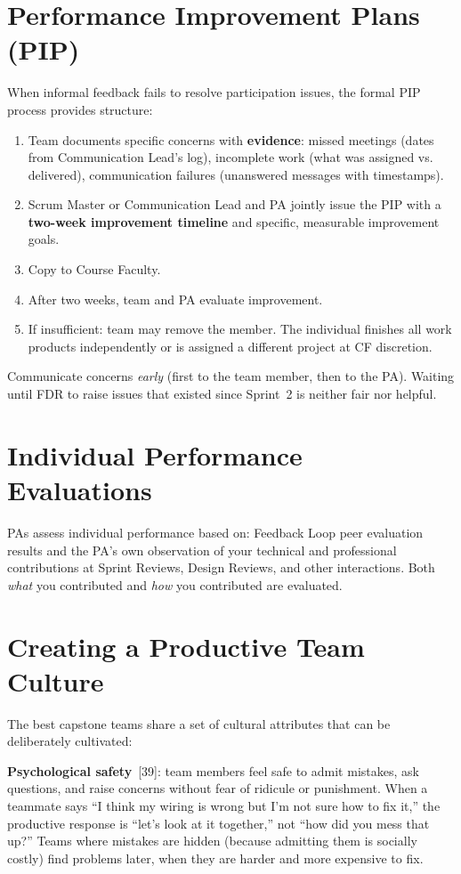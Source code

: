 \section{Performance Improvement Plans (PIP)}
When informal feedback fails to resolve participation issues, the formal PIP process provides structure:
\begin{enumerate}[nosep,leftmargin=1.5em]
\item Team documents specific concerns with \textbf{evidence}: missed meetings (dates from Communication Lead's log), incomplete work (what was assigned vs. delivered), communication failures (unanswered messages with timestamps).
\item Scrum Master or Communication Lead and PA jointly issue the PIP with a \textbf{two-week improvement timeline} and specific, measurable improvement goals.
\item Copy to Course Faculty.
\item After two weeks, team and PA evaluate improvement.
\item If insufficient: team may remove the member. The individual finishes all work products independently or is assigned a different project at CF discretion.
\end{enumerate}
Communicate concerns \emph{early} (first to the team member, then to the PA). Waiting until FDR to raise issues that existed since Sprint~2 is neither fair nor helpful.

\section{Individual Performance Evaluations}
PAs assess individual performance based on: Feedback Loop peer evaluation results and the PA's own observation of your technical and professional contributions at Sprint Reviews, Design Reviews, and other interactions. Both \emph{what} you contributed and \emph{how} you contributed are evaluated.

\section{Creating a Productive Team Culture}
The best capstone teams share a set of cultural attributes that can be deliberately cultivated:

\textbf{Psychological safety}~[39]: team members feel safe to admit mistakes, ask questions, and raise concerns without fear of ridicule or punishment. When a teammate says ``I think my wiring is wrong but I'm not sure how to fix it,'' the productive response is ``let's look at it together,'' not ``how did you mess that up?'' Teams where mistakes are hidden (because admitting them is socially costly) find problems later, when they are harder and more expensive to fix.

